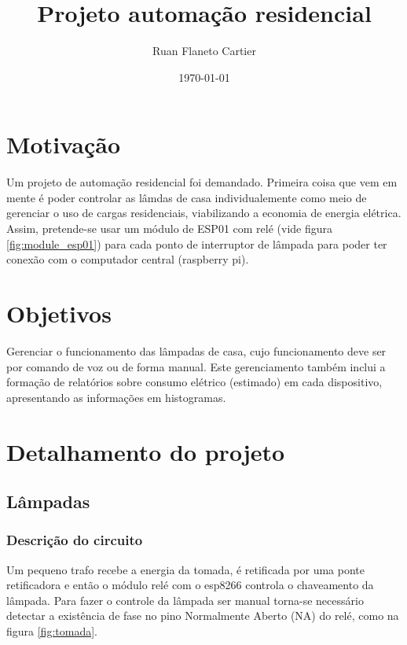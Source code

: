 \documentclass[11pt]{article}
\author{Ruan Flaneto Cartier}
\date{\today}
\title{Projeto automação residencial}
\begin{document}
\maketitle
\tableofcontents


\section{Motivação}
\label{sec:orgb9378d8}
Um projeto de automação residencial foi demandado. Primeira coisa que vem em mente é poder controlar as lâmdas de casa individualemente como meio de gerenciar o uso de cargas residenciais, viabilizando a economia de energia elétrica. Assim, pretende-se usar um módulo de ESP01 com relé (vide figura \ref{fig:module_esp01}) para cada ponto de interruptor de lâmpada para poder ter conexão com o computador central (raspberry pi).

\section{Objetivos}
\label{sec:org1356447}
Gerenciar o funcionamento das lâmpadas de casa, cujo funcionamento deve ser por comando de voz ou de forma manual. Este gerenciamento também inclui a formação de relatórios sobre consumo elétrico (estimado) em cada dispositivo, apresentando as informações em histogramas.

\section{Detalhamento do projeto}
\label{sec:org6ed61bc}
\subsection{Lâmpadas}
\label{sec:org1ab71dd}
\subsubsection{Descrição do circuito}
\label{sec:org7aaeb38}
Um pequeno trafo recebe a energia da tomada, é retificada por uma ponte retificadora e então o módulo relé com o esp8266 controla o chaveamento da lâmpada. Para fazer o controle da lâmpada ser manual torna-se necessário detectar a existência de fase no pino Normalmente Aberto (NA) do relé, como na figura \ref{fig:tomada}.
\end{document}
